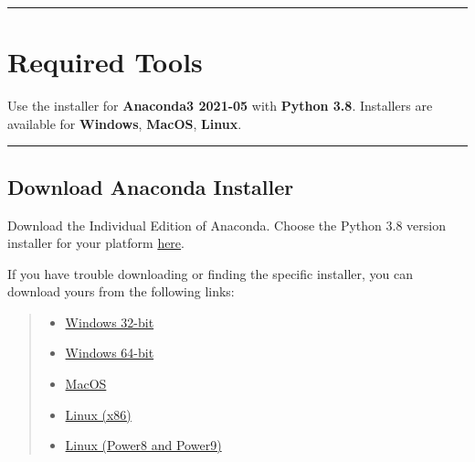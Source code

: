 \documentclass{latex-template/tufte-handout}
\begin{document}

\begin{center}\rule{\linewidth}{0.5pt}\end{center}

\section{Required Tools}

Use the installer for \textbf{Anaconda3 2021-05} with \textbf{Python
3.8}.%
Installers are available for \textbf{Windows}, \textbf{MacOS}, \textbf{Linux}.\\

\begin{center}\rule{\linewidth}{0.5pt}\end{center}


\subsection{Download Anaconda Installer}\label{download-anaconda-installer}

Download the Individual Edition of Anaconda. Choose the Python 3.8
version installer for your platform \href{https://repo.anaconda.com/archive/}{here}.

If you have trouble downloading or finding the specific installer, you
can download yours from the following links:
\begin{quote}
	
\begin{itemize}
\item \href{https://repo.anaconda.com/archive/Anaconda3-2021.05-Windows-x86.exe}{Windows
  32-bit}\\
\item \href{https://repo.anaconda.com/archive/Anaconda3-2021.05-Windows-x86_64.exe}{Windows
  64-bit}\\
\item \href{https://repo.anaconda.com/archive/Anaconda3-2021.05-MacOSX-x86_64.pkg}{MacOS}\\
\item \href{https://repo.anaconda.com/archive/Anaconda3-2021.05-Linux-x86_64.sh}{Linux
  (x86)}\\
\item \href{https://repo.anaconda.com/archive/Anaconda3-2021.05-Linux-ppc64le.sh}{Linux
  (Power8 and Power9)}
\end{itemize}
\end{quote}
\end{document}
